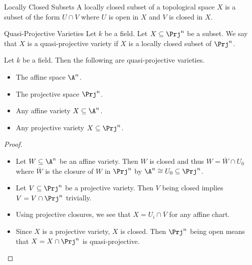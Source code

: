 \documentclass[a4paper]{article}
\begin{document}
\begin{defn}{Locally Closed Subsets}{} A locally closed subset of a topological space $X$ is a subset of the form $U\cap V$ where $U$ is open in $X$ and $V$ is closed in $X$. 
\end{defn}

\begin{defn}{Quasi-Projective Varieties}{} Let $k$ be a field. Let $X\subseteq\Prj^n$ be a subset. We say that $X$ is a quasi-projective variety if $X$ is a locally closed subset of $\Prj^n$. 
\end{defn}

\begin{prp}{}{} Let $k$ be a field. Then the following are quasi-projective varieties. 
\begin{itemize}
\item The affine space $\A^n$. 
\item The projective space $\Prj^n$. 
\item Any affine variety $X\subseteq\A^n$. 
\item Any projective variety $X\subseteq\Prj^n$. 
\end{itemize} 
\begin{proof}~\\
\begin{itemize}
\item Let $W\subseteq\A^n$ be an affine variety. Then $W$ is closed and thus $W=\overline{W}\cap U_0$ where $\overline{W}$ is the closure of $W$ in $\Prj^n$ by $\A^n\cong U_0\subseteq\Prj^n$. 
\item Let $V\subseteq\Prj^n$ be a projective variety. Then $V$ being closed implies $V=V\cap\Prj^n$ trivially. 
\item Using projective closures, we see that $X=U_i\cap\overline{V}$ for any affine chart. 
\item Since $X$ is a projective variety, $X$ is closed. Then $\Prj^n$ being open means that $X=X\cap\Prj^n$ is quasi-projective. 
\end{itemize}
\end{proof}
\end{prp}
\end{document}

